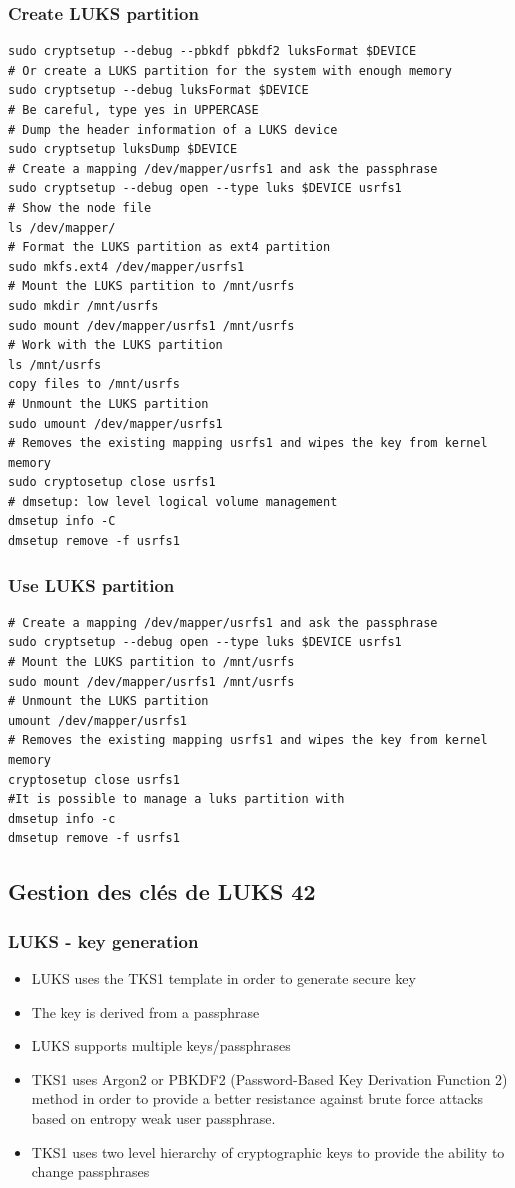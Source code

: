 \documentclass[resume]{subfiles}
\begin{document}
\subsubsection{Create LUKS partition}
\begin{lstlisting}[style=bash,label={},caption={}]
sudo cryptsetup --debug --pbkdf pbkdf2 luksFormat $DEVICE
# Or create a LUKS partition for the system with enough memory
sudo cryptsetup --debug luksFormat $DEVICE
# Be careful, type yes in UPPERCASE
# Dump the header information of a LUKS device
sudo cryptsetup luksDump $DEVICE
# Create a mapping /dev/mapper/usrfs1 and ask the passphrase
sudo cryptsetup --debug open --type luks $DEVICE usrfs1
# Show the node file
ls /dev/mapper/
# Format the LUKS partition as ext4 partition
sudo mkfs.ext4 /dev/mapper/usrfs1
# Mount the LUKS partition to /mnt/usrfs
sudo mkdir /mnt/usrfs
sudo mount /dev/mapper/usrfs1 /mnt/usrfs
# Work with the LUKS partition
ls /mnt/usrfs
copy files to /mnt/usrfs
# Unmount the LUKS partition
sudo umount /dev/mapper/usrfs1
# Removes the existing mapping usrfs1 and wipes the key from kernel memory
sudo cryptosetup close usrfs1
# dmsetup: low level logical volume management
dmsetup info -C
dmsetup remove -f usrfs1
\end{lstlisting}

\subsubsection{Use LUKS partition}
\begin{lstlisting}[style=bash,label={},caption={}]
# Create a mapping /dev/mapper/usrfs1 and ask the passphrase
sudo cryptsetup --debug open --type luks $DEVICE usrfs1
# Mount the LUKS partition to /mnt/usrfs
sudo mount /dev/mapper/usrfs1 /mnt/usrfs
# Unmount the LUKS partition
umount /dev/mapper/usrfs1
# Removes the existing mapping usrfs1 and wipes the key from kernel memory
cryptosetup close usrfs1
#It is possible to manage a luks partition with
dmsetup info -c
dmsetup remove -f usrfs1
\end{lstlisting}


\subsection{Gestion des clés de LUKS 42}
\subsubsection{LUKS - key generation}
\begin{itemize}
\item LUKS uses the TKS1 template in order to generate secure key
\item The key is derived from a passphrase
\item LUKS supports multiple keys/passphrases
\item TKS1 uses Argon2 or PBKDF2 (Password-Based Key Derivation Function 2) method in order to provide a better resistance against brute force attacks based on entropy weak user passphrase.
\item TKS1 uses two level hierarchy of cryptographic keys to provide the ability to change passphrases
\end{itemize}
\end{document}
